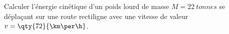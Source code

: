 Calculer l'énergie cinétique d'un poids lourd de masse $M=\qty{22}{tonnes}$ se
déplaçant sur une route rectiligne avec une vitesse de valeur
$v=\qty{72}{\km\per\h}$.
